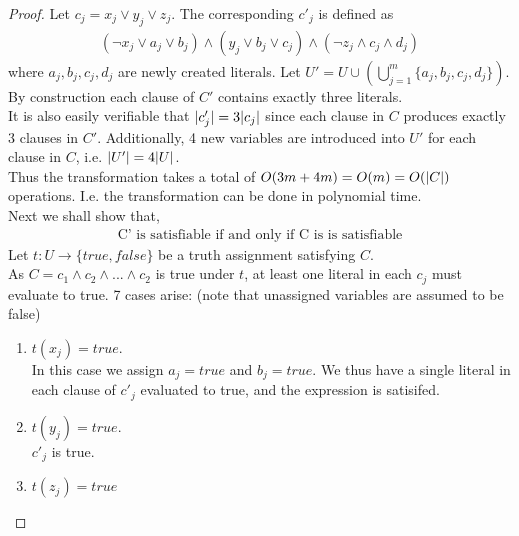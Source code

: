 \documentclass[12pt]{article}
\newenvironment{question}[2][Question]{\begin{trivlist}
\item[\hskip \labelsep {\bfseries #1}\hskip \labelsep {\bfseries #2.}]}{\end{trivlist}}
\DeclarePairedDelimiter\abs{\lvert}{\rvert}%
\begin{document}
\begin{question}{1}
\begin{proof}
    Let $c_{j} = x_{j} \vee y_{j} \vee z_{j}$. The corresponding $c'_{j}$ is
    defined as
    \begin{align*}
      (\neg x_{j} \vee a_{j} \vee b_{j}) \land (y_{j} \vee b_{j} \vee c_{j}) \land (\neg z_{j} \land c_{j} \land d_{j})
    \end{align*}
    where $a_{j}, b_{j}, c_{j}, d_{j}$ are newly created literals.
    Let $U' = U \cup (\bigcup_{j=1}^{m} \{a_{j}, b_{j}, c_{j}, d_{j}\})$. \\

    By construction each clause of $C'$ contains exactly three literals. \\

    It is also easily verifiable that $\abs{c'_{j}} = 3\abs{c_{j}}$ since each
    clause in $C$ produces exactly 3 clauses in $C'$.  Additionally, 4 new variables
    are introduced into $U'$ for each clause in $C$, i.e. $\abs{U'} = 4\abs{U}$. \\

    Thus the transformation takes a total of $O(3m + 4m) = O(m) = O(\abs{C})$ operations.
    I.e. the transformation can be done in polynomial time. \\

    Next we shall show that,
    \begin{align*}
      \text{C' is satisfiable if and only if C is is satisfiable}
    \end{align*}
    Let $t:U \rightarrow \{true, false\}$ be a truth assignment satisfying $C$. \\
    As $C = c_{1} \land c_{2} \land ... \land c_{2}$ is true under $t$, at least
    one literal in each $c_{j}$ must evaluate to true.
    7 cases arise: (note that unassigned variables are assumed to be false)
    \begin{enumerate}
      \item $t(x_{j}) = true$.\\
        In this case we assign $a_{j} = true$ and $b_{j} = true$.
        We thus have a single literal in each clause of $c'_{j}$ evaluated to true, and
        the expression is satisifed.
      \item $t(y_{j}) = true$. \\
        $c'_{j}$ is true.
      \item $t(z_{j}) = true$ \\

    \end{enumerate}
  \end{proof}
\end{question}
\end{document}
